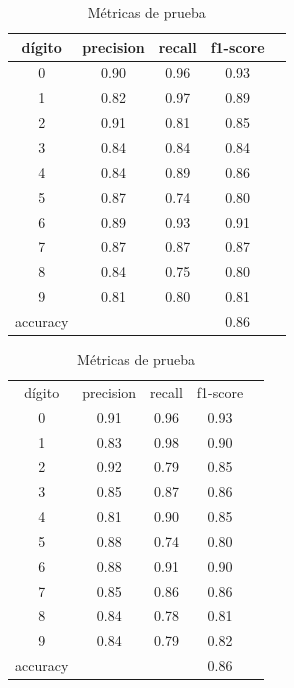 \documentclass[paper=letter, fontsize=11pt]{scrartcl}
\numberwithin{equation}{section} %
\numberwithin{figure}{section} %
\numberwithin{table}{section} %
\begin{document}
\begin{table}[H]
    \centering 
    \caption{Métricas de los conjuntos de entrenamiento y prueba.} \label{metricas_baseline}
\begin{minipage}{.5\linewidth}
        \caption{Métricas de entrenamiento}
        \centering
        \begin{tabular}{|c|c|c|c|c}
        \hline
dígito  & precision &  recall & f1-score\\ \hline \hline
0       &     0.90  &  0.96   &  0.93\\  
1       &     0.82  &  0.97   &  0.89\\  
2       &     0.91  &  0.81   &  0.85\\  
3       &     0.84  &  0.84   &  0.84\\  
4       &     0.84  &  0.89   &  0.86\\  
5       &     0.87  &  0.74   &  0.80\\  
6       &     0.89  &  0.93   &  0.91\\  
7       &     0.87  &  0.87   &  0.87\\  
8       &     0.84  &  0.75   &  0.80\\  
9       &     0.81  &  0.80   &  0.81\\ \hline \hline
accuracy  & & & 0.86 \\ \hline \hline
        \end{tabular}
    \end{minipage}%
    \begin{minipage}{.5\linewidth}
      \centering
        \caption{Métricas de prueba}
        \begin{tabular}{|c|c|c|c|c}
        \hline
        dígito  & precision &  recall & f1-score\\
0       &    0.91  &  0.96   &  0.93\\  
1       &    0.83  &  0.98   &  0.90\\  
2       &    0.92  &  0.79   &  0.85\\  
3       &    0.85  &  0.87   &  0.86\\  
4       &    0.81  &  0.90   &  0.85\\  
5       &    0.88  &  0.74   &  0.80\\  
6       &    0.88  &  0.91   &  0.90\\  
7       &    0.85  &  0.86   &  0.86\\  
8       &    0.84  &  0.78   &  0.81\\  
9       &    0.84  &  0.79   &  0.82\\  \hline \hline 
accuracy  & & & 0.86\\ \hline \hline
        \end{tabular}
    \end{minipage} 
\end{table}
\end{document}
